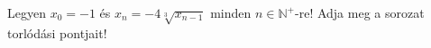 \documentclass[11pt]{scrartcl}
\begin{document}
Legyen $x_0 = -1$ és $x_n = -4 \sqrt[3]{x_{n - 1}}$ minden
$n \in \mathbb{N}^+$-re! Adja meg a sorozat torlódási pontjait!
\end{document}
